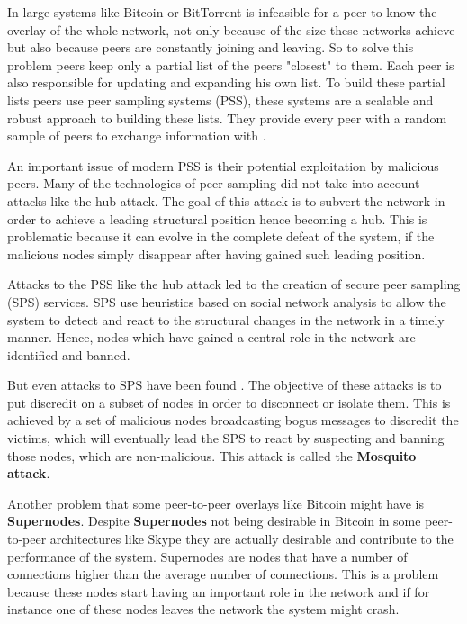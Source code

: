 In large systems like Bitcoin or BitTorrent is infeasible for a peer to know the overlay of the whole network, not only because of the size these networks achieve but also because peers are constantly joining and leaving. So to solve this problem peers keep only a partial list of the peers "closest" to them. Each peer is also responsible for updating and expanding his own list. To build these partial lists peers use peer sampling systems (PSS), these systems are a scalable and robust approach to building these lists. They provide every peer with a random sample of
peers to exchange information with \cite{jelasity2004peer}.

An important issue of modern PSS is their potential exploitation by malicious peers. Many of the technologies of peer sampling did not take into account attacks like the hub attack. The goal of this attack is to subvert the network in order to achieve a leading structural position hence becoming a hub. This is problematic because it can evolve in the complete defeat of the system, if the malicious nodes simply disappear after having gained such leading position.

Attacks to the PSS like the hub attack led to the creation of secure peer sampling (SPS) services. SPS use heuristics based on social network analysis to allow the system to detect and react to the structural changes in the network in a timely manner. Hence, nodes which have gained a central role in the network are identified and banned.

But even attacks to SPS have been found \cite{jesi2009secure}. The objective of these attacks is to put discredit on a subset of nodes in order to disconnect or isolate them. This is achieved by a set of malicious nodes broadcasting bogus messages to discredit the victims, which will eventually lead the SPS to react by suspecting and banning those nodes, which are non-malicious. This attack is called the \textbf{Mosquito attack}.

Another problem that some peer-to-peer overlays like Bitcoin might have is \textbf{Supernodes}. Despite \textbf{Supernodes}  not being desirable in Bitcoin in some peer-to-peer architectures like Skype they are actually desirable and contribute to the performance of the system. Supernodes are nodes that have a number of connections higher than the average number of connections. This is a problem because these nodes start having an important role in the network and if for instance one of these nodes leaves the network the system might crash.

